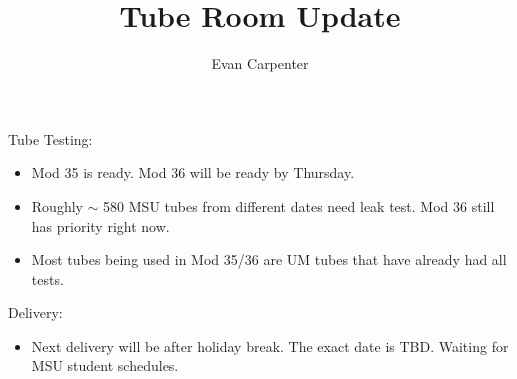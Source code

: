 \documentclass{beamer}
\title{Tube Room Update}
\author{Evan Carpenter}
\begin{document}
\begin{frame}
	\begin{block}{Tube Testing:}
		\begin{itemize}
			\item Mod 35 is ready. Mod 36 will be ready by Thursday. 
			\item Roughly $\sim$ 580 MSU tubes from different dates need leak test. Mod 36 still has priority right now. 
			\item Most tubes being used in Mod 35/36 are UM tubes that have already had all tests. 
		\end{itemize}
	\end{block}
	\begin{block}{Delivery:}
		\begin{itemize}
			\item \small Next delivery will be after holiday break. The exact date is TBD. Waiting for MSU student schedules.	
		\end{itemize}
	\end{block}	
\end{frame}
\end{document}
